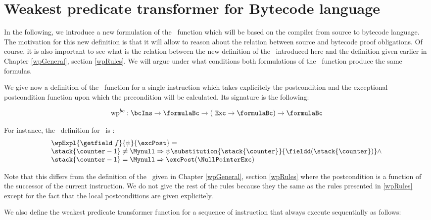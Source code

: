 \newtheorem{wpSeq}{Definition}[section]
\newtheorem{wpExpr}[wpSeq]{Definition}


\section{Weakest predicate transformer for Bytecode language} \label{pog:wpBc}
In the following, we introduce a new formulation of the \wpName \ function 
which will be based on the compiler from source to bytecode  language.
The motivation for this new definition is that it will allow to reason about the
 relation between source and bytecode proof
obligations. 
Of course, it is also important to see what is the relation between the new definition
of the \wpName \ introduced here and the definition  given earlier in Chapter \ref{wpGeneral}, section \ref{wpRules}. 
We will argue under what conditions both formulations of the \wpName \ function produce the same formulas.




We give now a definition of the \wpName \ function for a single instruction which takes
explicitely the postcondition and the exceptional postcondition function 
upon which the precondition will be calculated. Its signature is the following:

$$ \mbox{\rm\textrm{wp}}^{bc} : \bcIns \rightarrow \formulaBc \rightarrow ( \mbox{ \rm \texttt{Exc}} \rightarrow \formulaBc ) \rightarrow \formulaBc$$

For instance, the \wpName \ definition for \getfield \ is :
$$ \begin{array}{l} \wpExpl{\getfield \ f }{ \psi  }{ \excPost} = \\
		         \stack{\counter -1 } \neq \Mynull \Rightarrow 
			                \psi   \substitution{ \stack{\counter} }{ \fieldd(\stack{\counter})} 		                    
			  \wedge \\
			  \stack{\counter -1 }  = \Mynull  \Rightarrow   \excPost( \NullPointerExc )
			  \end{array}$$ 

Note that this differs from the definition of the \wpName \  given in Chapter \ref{wpGeneral}, section \ref{wpRules} where the postcondition 
is a function of the successor of the current instruction. We do not give the rest of the rules because they the same as the rules presented in \ref{wpRules} except
for the fact that the local postconditions are given explicitely.

We also define the weakest predicate transformer function  for a sequence of instruction that always execute sequentially as follows:

